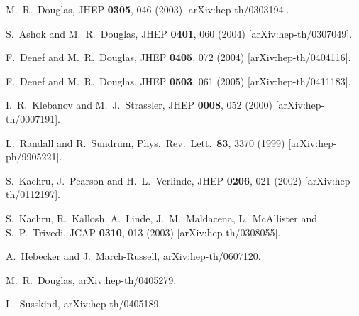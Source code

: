 \documentclass[aps,amsfonts]{ar2e}
\begin{document}
\begin{thebibliography}{999}
  M.~R.~Douglas,
  JHEP {\bf 0305}, 046 (2003)
  [arXiv:hep-th/0303194].

  S.~Ashok and M.~R.~Douglas,
  JHEP {\bf 0401}, 060 (2004)
  [arXiv:hep-th/0307049].

  F.~Denef and M.~R.~Douglas,
  JHEP {\bf 0405}, 072 (2004)
  [arXiv:hep-th/0404116].

  F.~Denef and M.~R.~Douglas,
  JHEP {\bf 0503}, 061 (2005)
  [arXiv:hep-th/0411183].

  I.~R.~Klebanov and M.~J.~Strassler,
  JHEP {\bf 0008}, 052 (2000)
  [arXiv:hep-th/0007191].

  L.~Randall and R.~Sundrum,
  Phys.\ Rev.\ Lett.\  {\bf 83}, 3370 (1999)
  [arXiv:hep-ph/9905221].

  S.~Kachru, J.~Pearson and H.~L.~Verlinde,
  JHEP {\bf 0206}, 021 (2002)
  [arXiv:hep-th/0112197].

  S.~Kachru, R.~Kallosh, A.~Linde, J.~M.~Maldacena, L.~McAllister and S.~P.~Trivedi,
  JCAP {\bf 0310}, 013 (2003)
  [arXiv:hep-th/0308055].

  A.~Hebecker and J.~March-Russell,
  arXiv:hep-th/0607120.

  M.~R.~Douglas,
  arXiv:hep-th/0405279.

  L.~Susskind,
  arXiv:hep-th/0405189.


\end{thebibliography}
\end{document}
